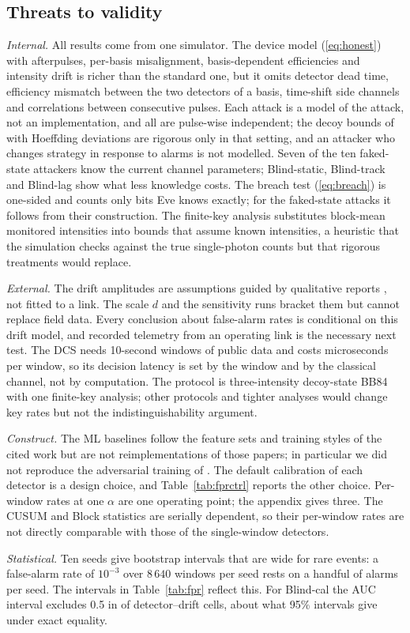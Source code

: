 \subsection{Threats to validity}
\emph{Internal.} All results come from one simulator. The device model (\ref{eq:honest}) with afterpulses, per-basis misalignment, basis-dependent efficiencies and intensity drift is richer than the standard one, but it omits detector dead time, efficiency mismatch between the two detectors of a basis, time-shift side channels and correlations between consecutive pulses. Each attack is a model of the attack, not an implementation, and all are pulse-wise independent; the decoy bounds of \cite{lim2014} with Hoeffding deviations are rigorous only in that setting, and an attacker who changes strategy in response to alarms is not modelled. Seven of the ten faked-state attackers know the current channel parameters; Blind-static, Blind-track and Blind-lag show what less knowledge costs. The breach test (\ref{eq:breach}) is one-sided and counts only bits Eve knows exactly; for the faked-state attacks it follows from their construction. The finite-key analysis substitutes block-mean monitored intensities into bounds that assume known intensities, a heuristic that the simulation checks against the true single-photon counts but that rigorous treatments \cite{wang2007,mizutani2015,zhang2017} would replace.

\emph{External.} The drift amplitudes are assumptions guided by qualitative reports \cite{dixon2010,dynes2012}, not fitted to a link. The scale $d$ and the sensitivity runs bracket them but cannot replace field data. Every conclusion about false-alarm rates is conditional on this drift model, and recorded telemetry from an operating link is the necessary next test. The DCS needs 10-second windows of public data and costs microseconds per window, so its decision latency is set by the window and by the classical channel, not by computation. The protocol is three-intensity decoy-state BB84 with one finite-key analysis; other protocols and tighter analyses \cite{tomamichel2012} would change key rates but not the indistinguishability argument.

\emph{Construct.} The ML baselines follow the feature sets and training styles of the cited work but are not reimplementations of those papers; in particular we did not reproduce the adversarial training of \cite{mohamed2026}. The default calibration of each detector is a design choice, and Table~\ref{tab:fprctrl} reports the other choice. Per-window rates at one $\alpha$ are one operating point; the appendix gives three. The CUSUM and Block statistics are serially dependent, so their per-window rates are not directly comparable with those of the single-window detectors.

\emph{Statistical.} Ten seeds give bootstrap intervals that are wide for rare events: a false-alarm rate of $10^{-3}$ over $8\,640$ windows per seed rests on a handful of alarms per seed. The intervals in Table~\ref{tab:fpr} reflect this. For Blind-cal the AUC interval excludes 0.5 in \nExclCal{} of \nCellsCal{} detector--drift cells, about what 95\% intervals give under exact equality.
